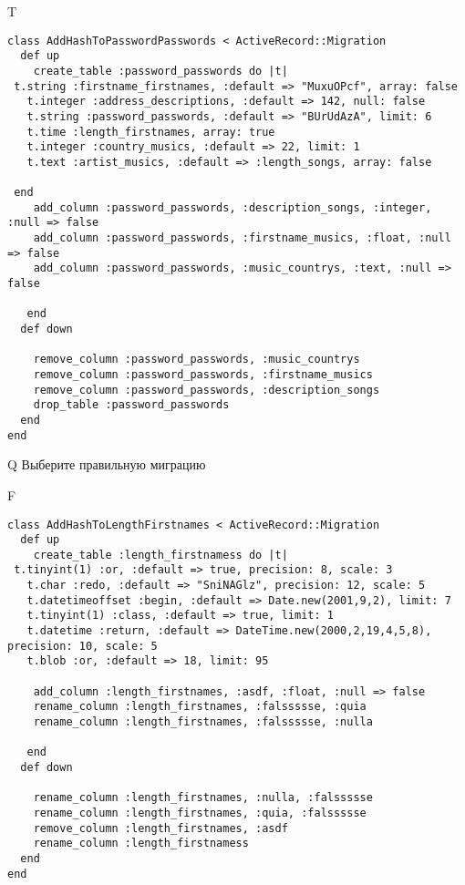 T
\begin{verbatim}
class AddHashToPasswordPasswords < ActiveRecord::Migration
  def up
    create_table :password_passwords do |t|
 t.string :firstname_firstnames, :default => "MuxuOPcf", array: false
   t.integer :address_descriptions, :default => 142, null: false
   t.string :password_passwords, :default => "BUrUdAzA", limit: 6
   t.time :length_firstnames, array: true
   t.integer :country_musics, :default => 22, limit: 1
   t.text :artist_musics, :default => :length_songs, array: false

 end
    add_column :password_passwords, :description_songs, :integer, :null => false
    add_column :password_passwords, :firstname_musics, :float, :null => false
    add_column :password_passwords, :music_countrys, :text, :null => false

   end
  def down

    remove_column :password_passwords, :music_countrys
    remove_column :password_passwords, :firstname_musics
    remove_column :password_passwords, :description_songs
    drop_table :password_passwords
  end
end
\end{verbatim}
Q
Выберите правильную миграцию

F
\begin{verbatim}
class AddHashToLengthFirstnames < ActiveRecord::Migration
  def up
    create_table :length_firstnamess do |t| 
 t.tinyint(1) :or, :default => true, precision: 8, scale: 3
   t.char :redo, :default => "SniNAGlz", precision: 12, scale: 5
   t.datetimeoffset :begin, :default => Date.new(2001,9,2), limit: 7
   t.tinyint(1) :class, :default => true, limit: 1
   t.datetime :return, :default => DateTime.new(2000,2,19,4,5,8), precision: 10, scale: 5
   t.blob :or, :default => 18, limit: 95

    add_column :length_firstnames, :asdf, :float, :null => false
    rename_column :length_firstnames, :falssssse, :quia
    rename_column :length_firstnames, :falssssse, :nulla

   end
  def down

    rename_column :length_firstnames, :nulla, :falssssse
    rename_column :length_firstnames, :quia, :falssssse
    remove_column :length_firstnames, :asdf
    rename_column :length_firstnamess
  end
end
\end{verbatim}


